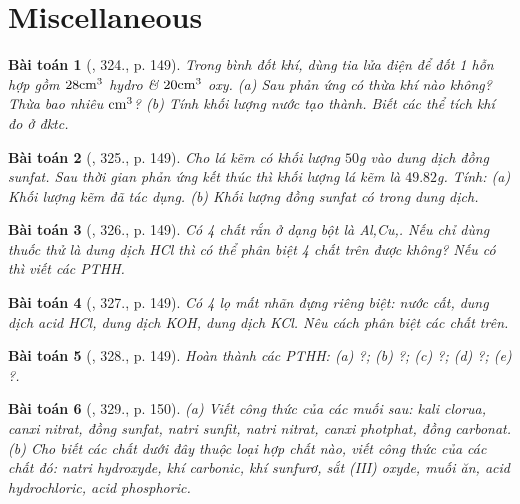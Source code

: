 \documentclass{article}
\newtheorem{baitoan}{Bài toán}
\begin{document}

\section{Miscellaneous}

\begin{baitoan}[\cite{An_400_BT_Hoa_Hoc_8_2020}, 324., p. 149]
	Trong bình đốt khí, dùng tia lửa điện để đốt 1 hỗn hợp gồm $\rm28cm^3$ hydro \& $\rm20cm^3$ oxy. (a) Sau phản ứng có thừa khí nào không? Thừa bao nhiêu $\rm cm^3$? (b) Tính khối lượng nước tạo thành. Biết các thể tích khí đo ở đktc.
\end{baitoan}

\begin{baitoan}[\cite{An_400_BT_Hoa_Hoc_8_2020}, 325., p. 149]
	Cho lá kẽm có khối lượng $50$\emph{g} vào dung dịch đồng sunfat. Sau thời gian phản ứng kết thúc thì khối lượng lá kẽm là $49.82$\emph{g}. Tính: (a) Khối lượng kẽm đã tác dụng. (b) Khối lượng đồng sunfat có trong dung dịch.
\end{baitoan}

\begin{baitoan}[\cite{An_400_BT_Hoa_Hoc_8_2020}, 326., p. 149]
	Có 4 chất rắn ở dạng bột là \emph{Al,Cu,}. Nếu chỉ dùng thuốc thử là dung dịch \emph{HCl} thì có thể phân biệt 4 chất trên được không? Nếu có thì viết các PTHH.
\end{baitoan}

\begin{baitoan}[\cite{An_400_BT_Hoa_Hoc_8_2020}, 327., p. 149]
	Có 4 lọ mất nhãn đựng riêng biệt: nước cất, dung dịch acid \emph{HCl}, dung dịch \emph{KOH}, dung dịch \emph{KCl}. Nêu cách phân biệt các chất trên.
\end{baitoan}

\begin{baitoan}[\cite{An_400_BT_Hoa_Hoc_8_2020}, 328., p. 149]
	Hoàn thành các PTHH: (a) \emph{} ?; (b) \emph{} ?; (c) \emph{} ?; (d) \emph{} ?; (e) \emph{} ?.
\end{baitoan}

\begin{baitoan}[\cite{An_400_BT_Hoa_Hoc_8_2020}, 329., p. 150]
	(a) Viết công thức của các muối sau: kali clorua, canxi nitrat, đồng sunfat, natri sunfit, natri nitrat, canxi photphat, đồng carbonat. (b) Cho biết các chất dưới đây thuộc loại hợp chất nào, viết công thức của các chất đó: natri hydroxyde, khí carbonic, khí sunfurơ, sắt (III) oxyde, muối ăn, acid hydrochloric, acid phosphoric.
\end{baitoan}
\end{document}
